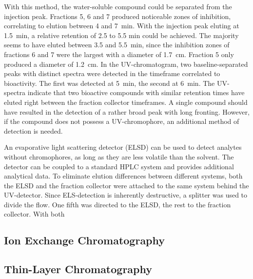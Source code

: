 	    With this method, the water-soluble compound could be separated from the injection peak. Fractions 5, 6 and 7 produced noticeable zones of inhibition, correlating to elution between 4 and 7~min. With the injection peak eluting at 1.5~min, a relative retention of 2.5 to 5.5 min could be achieved. The majority seems to have eluted between 3.5 and 5.5~min, since the inhibition zones of fractions 6 and 7 were the largest with a diameter of \SI{1.7}{\centi\meter}. Fraction 5 only produced a diameter of \SI{1.2}{\centi\meter}. In the UV-chromatogram, two baseline-separated peaks with distinct spectra were detected in the timeframe correlated to bioactivity. The first was detected at 5~min, the second at 6~min. The UV-spectra  indicate that two bioactive compounds with similar retention times have eluted right between the fraction collector timeframes. A single compound should have resulted in the detection of a rather broad peak with long fronting. However, if the compound does not possess a UV-chromophore, an additional method of detection is needed.

		An evaporative light scattering detector (ELSD) can be used to detect analytes without chromophores, as long as they are less volatile than the solvent.\autocite{Mathews2004,Righezza1988,Mourey1984,Charlesworth1978} The detector can be coupled to a standard HPLC system and provides additional analytical data. To eliminate elution differences between different systems, both the ELSD and the fraction collector were attached to the same system behind the UV-detector. Since ELS-detection is inherently destructive, a splitter was used to divide the flow. One fifth was directed to the ELSD, the rest to the fraction collector. With both 
	    
	    

    \subsection{Ion Exchange Chromatography} %
    \label{sub:results_ion_exchange_chromatography}


    \subsection{Thin-Layer Chromatography} %
    \label{sub:results_thin_layer_chromatography}

